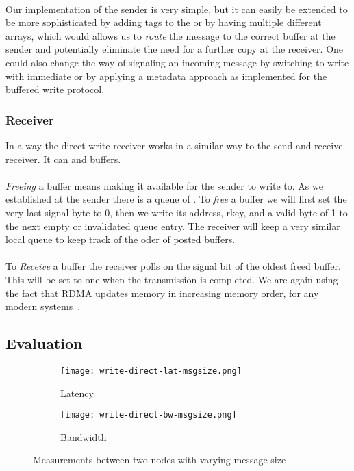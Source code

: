 \paragraph{} Our implementation of the sender is very simple, but it can easily be extended to be more sophisticated by adding
tags to the  or by having multiple different arrays, which would allows us to \emph{route} the message to the
correct buffer at the sender and potentially eliminate the need for a further copy at the receiver. One could also change
the way of signaling an incoming message by switching to write with immediate or by applying a metadata approach as implemented
for the buffered write protocol.

\subsubsection{Receiver}

In a way the direct write receiver works in a similar way to the send and receive receiver. It can  and 
 buffers. 

\paragraph{}\emph{Freeing} a buffer means making it available for the sender to write to. As we established at the sender 
there is a queue of . To \emph{free} a buffer we will first set the very last signal byte to 0, then we
write its address, rkey, and a valid byte of 1 to the next empty or invalidated queue entry. The receiver will keep a very 
similar local queue to keep track of the oder of posted buffers.

\paragraph{} To \emph{Receive} a buffer the receiver polls on the signal bit of the oldest freed buffer. This will be set
to one when the transmission is completed. We are again using the fact that RDMA updates memory in increasing memory order, 
for any modern systems~\cite{herd, farm}.

\subsection{Evaluation}


\begin{figure}[htp]
  \centering
\begin{subfigure}[b]{0.49\textwidth}
  \centering
  \texttt{[image: write-direct-lat-msgsize.png]}
  \caption{Latency}
  \label{fig:plot-wdir-lat}
\end{subfigure}
\begin{subfigure}[b]{0.49\textwidth}
  \centering
  \texttt{[image: write-direct-bw-msgsize.png]}
  \caption{Bandwidth}
  \label{fig:plot-wdir-bw}
\end{subfigure}
\caption{Measurements between two nodes with varying message size}
\end{figure}
